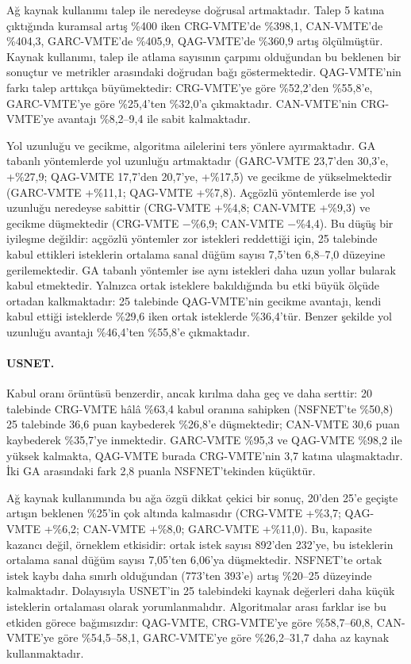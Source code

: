 \documentclass[10pt,twocolumn]{article}
\begin{document}
Ağ kaynak kullanımı talep ile neredeyse doğrusal artmaktadır. Talep 5 katına çıktığında kuramsal artış \%400 iken CRG-VMTE'de \%398,1, CAN-VMTE'de \%404,3, GARC-VMTE'de \%405,9, QAG-VMTE'de \%360,9 artış ölçülmüştür. Kaynak kullanımı, talep ile atlama sayısının çarpımı olduğundan bu beklenen bir sonuçtur ve metrikler arasındaki doğrudan bağı göstermektedir. QAG-VMTE'nin farkı talep arttıkça büyümektedir: CRG-VMTE'ye göre \%52,2'den \%55,8'e, GARC-VMTE'ye göre \%25,4'ten \%32,0'a çıkmaktadır. CAN-VMTE'nin CRG-VMTE'ye avantajı \%8,2--9,4 ile sabit kalmaktadır.

Yol uzunluğu ve gecikme, algoritma ailelerini ters yönlere ayırmaktadır. GA tabanlı yöntemlerde yol uzunluğu artmaktadır (GARC-VMTE 23,7'den 30,3'e, +\%27,9; QAG-VMTE 17,7'den 20,7'ye, +\%17,5) ve gecikme de yükselmektedir (GARC-VMTE +\%11,1; QAG-VMTE +\%7,8). Açgözlü yöntemlerde ise yol uzunluğu neredeyse sabittir (CRG-VMTE +\%4,8; CAN-VMTE +\%9,3) ve gecikme düşmektedir (CRG-VMTE $-$\%6,9; CAN-VMTE $-$\%4,4). Bu düşüş bir iyileşme değildir: açgözlü yöntemler zor istekleri reddettiği için, 25 talebinde kabul ettikleri isteklerin ortalama sanal düğüm sayısı 7,5'ten 6,8--7,0 düzeyine gerilemektedir. GA tabanlı yöntemler ise aynı istekleri daha uzun yollar bularak kabul etmektedir. Yalnızca ortak isteklere bakıldığında bu etki büyük ölçüde ortadan kalkmaktadır: 25 talebinde QAG-VMTE'nin gecikme avantajı, kendi kabul ettiği isteklerde \%29,6 iken ortak isteklerde \%36,4'tür. Benzer şekilde yol uzunluğu avantajı \%46,4'ten \%55,8'e çıkmaktadır.

\paragraph{USNET.} Kabul oranı örüntüsü benzerdir, ancak kırılma daha geç ve daha serttir: 20 talebinde CRG-VMTE hâlâ \%63,4 kabul oranına sahipken (NSFNET'te \%50,8) 25 talebinde 36,6 puan kaybederek \%26,8'e düşmektedir; CAN-VMTE 30,6 puan kaybederek \%35,7'ye inmektedir. GARC-VMTE \%95,3 ve QAG-VMTE \%98,2 ile yüksek kalmakta, QAG-VMTE burada CRG-VMTE'nin 3,7 katına ulaşmaktadır. İki GA arasındaki fark 2,8 puanla NSFNET'tekinden küçüktür.

Ağ kaynak kullanımında bu ağa özgü dikkat çekici bir sonuç, 20'den 25'e geçişte artışın beklenen \%25'in çok altında kalmasıdır (CRG-VMTE +\%3,7; QAG-VMTE +\%6,2; CAN-VMTE +\%8,0; GARC-VMTE +\%11,0). Bu, kapasite kazancı değil, örneklem etkisidir: ortak istek sayısı 892'den 232'ye, bu isteklerin ortalama sanal düğüm sayısı 7,05'ten 6,06'ya düşmektedir. NSFNET'te ortak istek kaybı daha sınırlı olduğundan (773'ten 393'e) artış \%20--25 düzeyinde kalmaktadır. Dolayısıyla USNET'in 25 talebindeki kaynak değerleri daha küçük isteklerin ortalaması olarak yorumlanmalıdır. Algoritmalar arası farklar ise bu etkiden görece bağımsızdır: QAG-VMTE, CRG-VMTE'ye göre \%58,7--60,8, CAN-VMTE'ye göre \%54,5--58,1, GARC-VMTE'ye göre \%26,2--31,7 daha az kaynak kullanmaktadır.
\end{document}
